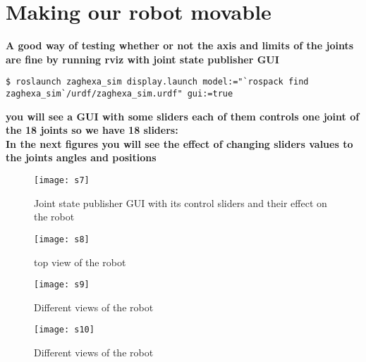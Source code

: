 \section{Making our robot movable}
\textbf{A good way of testing whether or not the axis and limits of the joints are fine by running rviz with joint state publisher GUI}
\begin{lstlisting}[language=terCmd]
$ roslaunch zaghexa_sim display.launch model:="`rospack find zaghexa_sim`/urdf/zaghexa_sim.urdf" gui:=true
\end{lstlisting}


\textbf{you will see a GUI with some sliders each of them controls one joint of the 18 joints so we have 18 sliders:}
\\\textbf{In the next figures you will see the effect of changing sliders values to the joints angles and positions}
\begin{figure}[h]
	\centering
	\texttt{[image: s7]}
	\caption{Joint state publisher GUI with its control sliders and their effect on the robot }
	\label{fig:s7}
\end{figure}
\begin{figure}[htb]
	\centering
	\texttt{[image: s8]}
	\caption{top view of the robot}
	\label{fig:s8}
	\texttt{[image: s9]}
	\caption{Different views of the robot}
	\label{fig:s9}
	\texttt{[image: s10]}
	\caption{Different views of the robot}
	\label{fig:s10}
\end{figure}